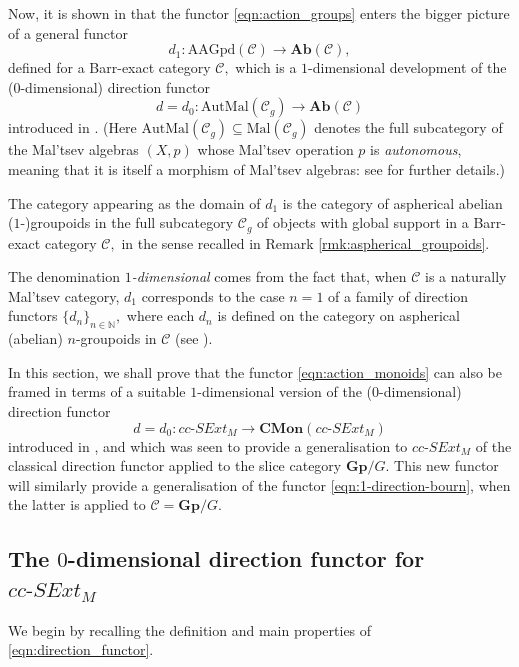 \documentclass[a4paper]{amsart}
\theoremstyle{plain}
\theoremstyle{definition}
\theoremstyle{remark}
\begin{document}
Now, it is shown in \cite{aspherical} that the functor \eqref{eqn:action_groups} enters the bigger picture of a general functor
\begin{equation}
\label{eqn:1-direction-bourn}
d_1\colon\mathrm{AAGpd}(\mathcal{C})\longrightarrow\mathbf{Ab}(\mathcal{C}),
\end{equation}
defined for a Barr-exact category $\mathcal{C},$ which is a $1$-dimensional development of the ($0$-dimensional) direction functor
\begin{equation}
\label{eqn:0-direction-bourn}
d=d_0\colon\mathrm{AutMal}({\mathcal{C}}_g)\longrightarrow\mathbf{Ab}(\mathcal{C})
\end{equation}
introduced in \cite{bourn-direction}. (Here $\mathrm{AutMal}({\mathcal{C}}_g)\subseteq\mathrm{Mal}({\mathcal{C}}_g)$ denotes the full subcategory of the Mal'tsev algebras $(X,p)$ whose Mal'tsev operation $p$ is \emph{autonomous}, meaning that it is itself a morphism of Mal'tsev algebras: see \cite{bourn-direction} for further details.)

The category appearing as the domain of $d_1$ is the category of aspherical abelian ($1$-)groupoids in the full subcategory $\mathcal{C}_g$ of objects with global support in a Barr-exact category $\mathcal{C},$ in the sense recalled in Remark \ref{rmk:aspherical_groupoids}.

The denomination $1$\emph{-dimensional} comes from the fact that, when $\mathcal{C}$ is a naturally Mal'tsev category, $d_1$ corresponds to the case $n=1$ of a family of direction functors $\{d_n\}_{n\in\mathbb{N}},$ where each $d_n$ is defined on the category on aspherical (abelian) $n$-groupoids in $\mathcal{C}$ (see \cite{Bourn-Rodelo}).

In this section, we shall prove that the functor \eqref{eqn:action_monoids} can also be framed in terms of a suitable $1$-dimensional version of the ($0$-dimensional) direction functor
\begin{equation}
\label{eqn:direction_functor}
d=d_0\colon cc\text{-}SExt_M\longrightarrow\mathbf{CMon}(cc\text{-}SExt_M)
\end{equation}
introduced in \cite{AMR}, and which was seen to provide a generalisation to $cc\text{-}SExt_M$ of the classical direction functor \cite{bourn-direction} applied to the slice category $\mathbf{Gp}/G.$ This new functor will similarly provide a generalisation of the functor \eqref{eqn:1-direction-bourn}, when the latter is applied to $\mathcal{C}=\mathbf{Gp}/G.$
\subsection{The $0$-dimensional direction functor for $cc\text{-}SExt_M$}
We begin by recalling the definition and main properties of \eqref{eqn:direction_functor}.
\end{document}
